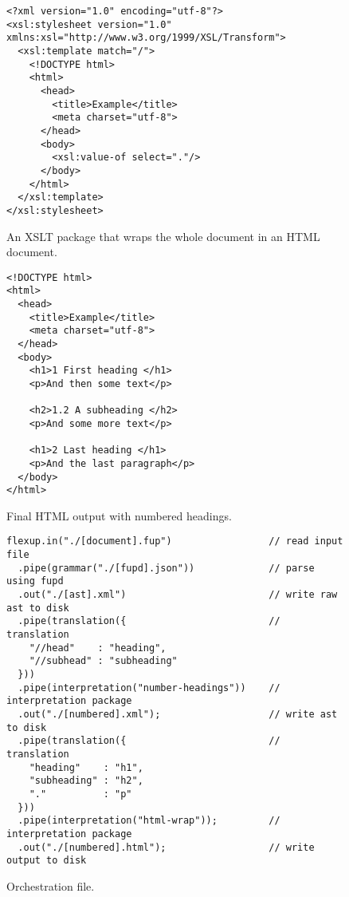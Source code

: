 \documentclass{scrreprt}
\begin{document}
\begin{figure}[h]
\begin{lstlisting}
<?xml version="1.0" encoding="utf-8"?>
<xsl:stylesheet version="1.0" xmlns:xsl="http://www.w3.org/1999/XSL/Transform">
  <xsl:template match="/">
    <!DOCTYPE html>
    <html>
      <head>
        <title>Example</title>
        <meta charset="utf-8">
      </head>
      <body>
        <xsl:value-of select="."/> 
      </body>
    </html>
  </xsl:template>
</xsl:stylesheet>
\end{lstlisting}
\caption{An XSLT package that wraps the whole document in an HTML document.}
\label{ex:numbered-headings-xslt-package-html-wrapper}
\end{figure}



\begin{figure}[h]
\begin{lstlisting}
<!DOCTYPE html>
<html>
  <head>
    <title>Example</title>
    <meta charset="utf-8">
  </head>
  <body>
    <h1>1 First heading </h1>
    <p>And then some text</p>

    <h2>1.2 A subheading </h2>
    <p>And some more text</p>

    <h1>2 Last heading </h1>
    <p>And the last paragraph</p>
  </body>
</html>
\end{lstlisting}
\caption{Final HTML output with numbered headings.}
\label{ex:numbered-headings-html-output}
\end{figure}



\begin{figure}[h]
\begin{lstlisting}
flexup.in("./[document].fup")                 // read input file
  .pipe(grammar("./[fupd].json"))             // parse using fupd
  .out("./[ast].xml")                         // write raw ast to disk
  .pipe(translation({                         // translation
    "//head"    : "heading",
    "//subhead" : "subheading"
  }))                    
  .pipe(interpretation("number-headings"))    // interpretation package
  .out("./[numbered].xml");                   // write ast to disk
  .pipe(translation({                         // translation
    "heading"    : "h1",
    "subheading" : "h2",
    "."          : "p"
  }))
  .pipe(interpretation("html-wrap"));         // interpretation package
  .out("./[numbered].html");                  // write output to disk
\end{lstlisting}
\caption{Orchestration file.}
\label{ex:numbered-headings-pipes-1}
\end{figure}
\end{document}
